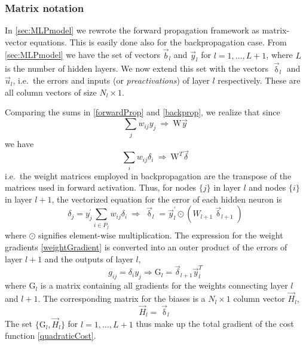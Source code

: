 \documentclass[twoside,english]{uiofysmaster}
\begin{document}
\subsubsection{Matrix notation}
In \autoref{sec:MLPmodel} we rewrote the forward propagation framework as matrix-vector equations. 
This is easily done also for the backpropagation case. From \autoref{sec:MLPmodel} we have the
set of vectors $\vec{b}_l$ and $\vec{y}_l$ for $l = 1,\dots ,L+1$, 
where $L$ is the number of hidden layers. We now extend this set with the vectors $\vec{\updelta}_l$ 
and $\vec{u}_l$, i.e.\ the errors and inputs (or \textit{preactivations}) of layer $l$
respectively. These are all column vectors of size $N_l \times 1$. 

\noindent Comparing the sums in \eqref{forwardProp} and \eqref{backprop}, we realize that since 
\begin{equation}
 \sum_j w_{ij} y_j \: \Rightarrow \: \mathrm{W} \vec{y}
\end{equation}
we have
\begin{equation}
  \sum_i w_{ij} \delta_i \:  \Rightarrow \: \mathrm{W}^T \vec{\delta}
\end{equation}
i.e.\ the weight matrices employed in backpropagation are the transpose of the matrices used in forward activation.
Thus, for nodes $\{j\}$ in layer $l$ and nodes $\{i\}$ in layer $l+1$, the vectorized equation for the error of each hidden neuron is
\begin{equation}
 \delta_j = y^\prime_j\sum_{i\in P_j}w_{ij} \delta_i \: \Rightarrow \:
 \vec{\updelta}_l = \vec{y}^\prime_l \odot (W_{l+1} \vec{\updelta}_{l+1})
\end{equation}
where $\odot$ signifies element-wise multiplication. The expression for the weight gradients \eqref{weightGradient} is converted
into an outer product of the errors of layer $l+1$ and the outputs of layer $l$,
\begin{equation}
 g_{ij} = \delta_i y_j \Rightarrow \mathrm{G}_l = \vec{\delta}_{l+1} \vec{y}^T_l
\end{equation}
where $\mathrm{G}_l$ is a matrix containing all gradients for the weights connecting layer $l$ and $l+1$. 
The corresponding matrix for the biases is a $N_l \times 1$ column vector $\vec{H}_l$,
\begin{equation}
 \vec{H}_l = \vec{\updelta}_l
\end{equation}
The set $\{\mathrm{G}_l, \vec{H}_l\}$ for $l=1,\dots,L+1$ thus make up the total gradient of the cost function \eqref{quadraticCost}. 
\end{document}
